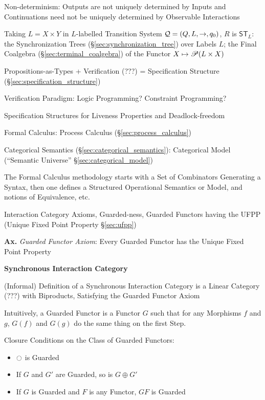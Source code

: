 Non-determinism: Outputs are not uniquely determined by Inputs and
Continuations need not be uniquely determined by Observable Interactions

Taking $L = X \times Y$ in $L$-labelled Transition System $\mathcal{Q} =
(Q,L,\rightarrow,q_0)$, $R$ is $\mathsf{ST}_L$: the Synchronization
Trees (\S\ref{sec:synchronization_tree}) over Labels $L$; the Final
Coalgebra (\S\ref{sec:terminal_coalgebra}) of the Functor $X \mapsto
\mathscr{P}(L \times X)$


\asterism


Propositions-as-Types + Verification (???) = Specification Structure
(\S\ref{sec:specification_structure})

Verification Paradigm: Logic Programming? Constraint Programming?

Specification Structures for Liveness Properties and Deadlock-freedom

Formal Calculus: Process Calculus (\S\ref{sec:process_calculus})

Categorical Semantics (\S\ref{sec:categorical_semantics}): Categorical
Model (``Semantic Universe'' \S\ref{sec:categorical_model})

The Formal Calculus methodology starts with a Set of Combinators
Generating a Syntax, then one defines a Structured Operational
Semantics or Model, and notions of Equivalence, etc.

Interaction Category Axioms, Guarded-ness, Guarded Functors having the
UFPP (Unique Fixed Point Property \S\ref{sec:ufpp}) %

\textbf{Ax.} \emph{Guarded Functor Axiom}: Every Guarded Functor has
the Unique Fixed Point Property


\textbf{Synchronous Interaction Category}

(Informal) Definition of a Synchronous Interaction Category is a
Linear Category (???) with Biproducts, Satisfying the Guarded Functor
Axiom

Intuitively, a Guarded Functor is a Functor $G$ such that for any
Morphisms $f$ and $g$, $G(f)$ and $G(g)$ do the same thing on the
first Step.

Closure Conditions on the Class of Guarded Functors:
\begin{itemize}
  \item $\ocircle$ is Guarded
  \item If $G$ and $G'$ are Guarded, so is $G \oplus G'$
  \item If $G$ is Guarded and $F$ is any Functor, $G F$ is Guarded
\end{itemize}

